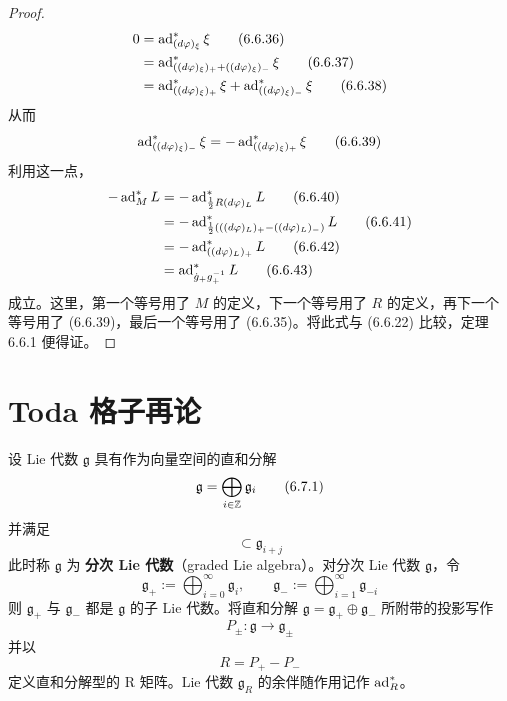 \begin{proof}
\begin{align}
  0 &= \operatorname{ad}^*_{(d\varphi)_\xi}\xi \tag{6.6.36}\\
  &= \operatorname{ad}^*_{((d\varphi)_\xi)_+ + ((d\varphi)_\xi)_-}\xi \tag{6.6.37}\\
  &= \operatorname{ad}^*_{((d\varphi)_\xi)_+}\xi + \operatorname{ad}^*_{((d\varphi)_\xi)_-}\xi \tag{6.6.38}
\end{align}
从而
\begin{equation}
  \operatorname{ad}^*_{((d\varphi)_\xi)_-}\xi = -\operatorname{ad}^*_{((d\varphi)_\xi)_+}\xi
  \tag{6.6.39}
\end{equation}
利用这一点，
\begin{align}
  -\operatorname{ad}^*_ML &= -\operatorname{ad}^*_{\frac{1}{2}R(d\varphi)_L}L \tag{6.6.40}\\
  &= -\operatorname{ad}^*_{\frac{1}{2}(((d\varphi)_L)_+ - ((d\varphi)_L)_-)}L \tag{6.6.41}\\
  &= -\operatorname{ad}^*_{((d\varphi)_L)_+}L \tag{6.6.42}\\
  &= \operatorname{ad}^*_{\dot{g}_+g_+^{-1}}L \tag{6.6.43}
\end{align}
  成立。这里，第一个等号用了 $M$ 的定义，下一个等号用了 $R$ 的定义，再下一个等号用了 (6.6.39)，最后一个等号用了 (6.6.35)。将此式与 (6.6.22) 比较，定理 6.6.1 便得证。
\end{proof}

\section{Toda 格子再论}

设 Lie 代数 $\mathfrak{g}$ 具有作为向量空间的直和分解
\begin{equation}
  \mathfrak{g} = \bigoplus_{i\in\mathbb{Z}}\mathfrak{g}_i
  \tag{6.7.1}
\end{equation}
并满足
\begin{equation}
  [\mathfrak{g}_i,\mathfrak{g}_j] \subset \mathfrak{g}_{i+j}
  \tag{6.7.2}
\end{equation}
此时称 $\mathfrak{g}$ 为 \textbf{分次 Lie 代数}（graded Lie algebra）。对分次 Lie 代数 $\mathfrak{g}$，令
\begin{equation}
  \mathfrak{g}_+ := \bigoplus_{i=0}^{\infty}\mathfrak{g}_i,\qquad
  \mathfrak{g}_- := \bigoplus_{i=1}^{\infty}\mathfrak{g}_{-i}
  \tag{6.7.3}
\end{equation}
则 $\mathfrak{g}_+$ 与 $\mathfrak{g}_-$ 都是 $\mathfrak{g}$ 的子 Lie 代数。将直和分解 $\mathfrak{g}=\mathfrak{g}_+\oplus\mathfrak{g}_-$ 所附带的投影写作
\begin{equation}
  P_\pm:\mathfrak{g}\to\mathfrak{g}_\pm
  \tag{6.7.4}
\end{equation}
并以
\begin{equation}
  R = P_+ - P_-
  \tag{6.7.5}
\end{equation}
定义直和分解型的 R 矩阵。Lie 代数 $\mathfrak{g}_R$ 的余伴随作用记作 $\operatorname{ad}^*_R$。

